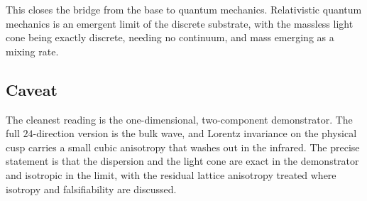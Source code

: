 This closes the bridge from the base to quantum mechanics. Relativistic quantum mechanics is an emergent limit
of the discrete substrate, with the massless light cone being exactly discrete, needing no continuum, and mass
emerging as a mixing rate.

\subsection{Caveat}

The cleanest reading is the one-dimensional, two-component demonstrator. The full $24$-direction version is the
bulk wave, and Lorentz invariance on the physical cusp carries a small cubic anisotropy that washes out in the
infrared. The precise statement is that the dispersion and the light cone are exact in the demonstrator and
isotropic in the limit, with the residual lattice anisotropy treated where isotropy and falsifiability are
discussed.
